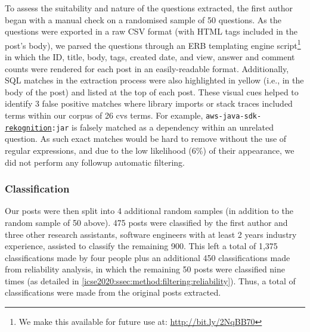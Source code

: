 To assess the suitability and nature of the \NumPostsFromSO{} questions extracted, the first author began with a manual check on a randomised sample of 50 questions. As the questions were exported in a raw CSV format (with HTML tags included in the post's body), we parsed the questions through an ERB templating engine script\footnote{We make this available for future use at: \url{http://bit.ly/2NqBB70}} in which the ID, title, body, tags, created date, and view, answer and comment counts were rendered for each post in an easily-readable format. %
Additionally, SQL matches in the extraction process were also highlighted in yellow (i.e., in the body of the post) and listed at the top of each post. These visual cues helped to identify 3 false positive matches where library imports or stack traces included terms within our corpus of 26 \gls{cvs} terms. For example, \texttt{aws-java-sdk-\uline{rekognition}:jar} is falsely matched as a dependency within an unrelated question. As such exact matches would be hard to remove without the use of regular expressions, and due to the low likelihood (6\%) of their appearance, we did not perform any followup automatic filtering.

\subsubsection{Classification}
\label{icse2020:ssec:method:filtering:classification}

Our \NumPostsFromSO{} posts were then split into 4 additional random samples (in addition to the random sample of 50 above). 475 posts were classified by the first author and three other research assistants, software engineers with at least 2 years industry experience, assisted to classify the remaining 900. This left a total of 1,375 classifications made by four people plus an additional 450 classifications made from reliability analysis, in which the remaining 50 posts were classified nine times (as detailed in \cref{icse2020:ssec:method:filtering:reliability}). Thus, a total of \NumPostsCategorised{} classifications were made from the original \NumPostsFromSO{} posts extracted.

